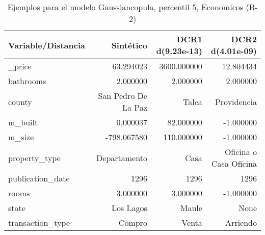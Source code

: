 \begin{table}[H]
\centering
\fontsize{10}{14}\selectfont
\caption{Ejemplos para el modelo Gaussiancopula, percentil 5, Economicos (B-2)}
\label{table-example-economicos-b-2-gaussiancopula-5p}
\begin{tabular}{|l|r|r|r|}
\hline
\rowcolor[gray]{0.8}
Variable/Distancia & Sintético & DCR1 d(9.23e-13) & DCR2 d(4.01e-09) \\
\hline \_price & \cellcolor[rgb]{0.9, 0.54, 0.52} 63.294023 & 3600.000000 & 12.804434 \\
\hline bathrooms & \cellcolor[rgb]{0.9, 0.54, 0.52} 2.000000 & \cellcolor[rgb]{0.9, 0.54, 0.52} 2.000000 & \cellcolor[rgb]{0.9, 0.54, 0.52} 2.000000 \\
\hline county & \cellcolor[rgb]{0.9, 0.54, 0.52} San Pedro De La Paz & Talca & Providencia \\
\hline m\_built & \cellcolor[rgb]{0.9, 0.54, 0.52} 0.000037 & 82.000000 & \cellcolor[rgb]{0.9, 0.54, 0.52} -1.000000 \\
\hline m\_size & \cellcolor[rgb]{0.9, 0.54, 0.52} -798.067580 & 110.000000 & \cellcolor[rgb]{0.9, 0.54, 0.52} -1.000000 \\
\hline property\_type & \cellcolor[rgb]{0.9, 0.54, 0.52} Departamento & Casa & Oficina o Casa Oficina \\
\hline publication\_date & \cellcolor[rgb]{0.9, 0.54, 0.52} 1296 & \cellcolor[rgb]{0.9, 0.54, 0.52} 1296 & \cellcolor[rgb]{0.9, 0.54, 0.52} 1296 \\
\hline rooms & \cellcolor[rgb]{0.9, 0.54, 0.52} 3.000000 & \cellcolor[rgb]{0.9, 0.54, 0.52} 3.000000 & -1.000000 \\
\hline state & \cellcolor[rgb]{0.9, 0.54, 0.52} Los Lagos & Maule & None \\
\hline transaction\_type & \cellcolor[rgb]{0.9, 0.54, 0.52} Compro & Venta & Arriendo \\
\hline
\end{tabular}
\end{table}
